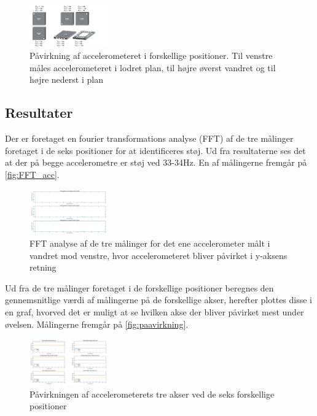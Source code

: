 \begin{figure}[H]
\centering
\includegraphics[width=0.3\textwidth]{figures/acc_paavirkning}
\caption{Påvirkning af accelerometeret i forskellige positioner. Til venstre måles accelerometeret i lodret plan, til højre øverst vandret og til højre nederst i plan \citep{analogdevices2010}}
\label{fig:acc_paavirkning}
\end{figure}

\subsection{Resultater}
Der er foretaget en fourier transformations analyse (FFT) af de tre målinger foretaget i de seks positioner for at identificeres støj. Ud fra resultaterne ses det at der på begge accelerometre er støj ved 33-34Hz. En af målingerne fremgår på \autoref{fig:FFT_acc}. 

\begin{figure}[H]
\centering
\includegraphics[width=0.3\textwidth]{figures/FFT_acc}
\caption{FFT analyse af de tre målinger for det ene accelerometer målt i vandret mod venstre, hvor accelerometeret bliver påvirket i y-aksens retning}
\label{fig:FFT_acc}
\end{figure}

Ud fra de tre målinger foretaget i de forskellige positioner beregnes den gennemsnitlige værdi af målingerne på de forskellige akser, herefter plottes disse i en graf, hvorved det er muligt at se hvilken akse der bliver påvirket mest under øvelsen. Målingerne fremgår på \autoref{fig:paavirkning}. 

\begin{figure}[H]
\centering
\includegraphics[width=0.3\textwidth]{figures/paavirkning}
\caption{Påvirkningen af accelerometerets tre akser ved de seks forskellige positioner}
\label{fig:paavirkning}
\end{figure}

